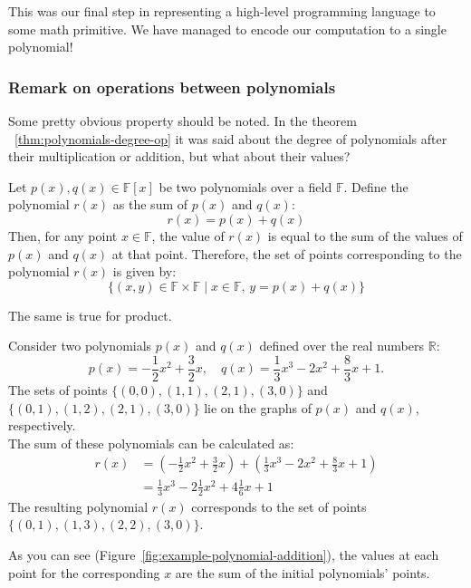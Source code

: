 \documentclass[../lecture-notes.tex]{subfiles}
\begin{document}
This was our final step in representing a high-level programming language to some math primitive.
We have managed to encode our computation to a single polynomial!

\subsubsection*{Remark on operations between polynomials}

\begin{remark}
    Some pretty obvious property should be noted. In the theorem ~\ref{thm:polynomials-degree-op}
    it was said about the degree of polynomials after their multiplication or addition, but what
    about their values?

    Let $p(x), q(x) \in \mathbb{F}[x]$ be two polynomials over a field $\mathbb{F}$. Define the 
    polynomial $r(x)$ as the sum of $p(x)$ and $q(x)$:
    \begin{equation*}
        r(x) = p(x) + q(x)
    \end{equation*}
    Then, for any point $x \in \mathbb{F}$, the value of $r(x)$ is equal to the sum of the
    values of $p(x)$ and $q(x)$ at that point. Therefore, the set of points corresponding to the 
    polynomial $r(x)$ is given by:
    \begin{equation*}
        \{(x, y) \in \mathbb{F} \times \mathbb{F} \mid x \in \mathbb{F}, \, y = p(x) + q(x) \}
    \end{equation*}

    The same is true for product.
\end{remark}

\begin{example}
    Consider two polynomials $p(x)$ and $q(x)$ defined over the real numbers $\mathbb{R}$:
    \begin{equation*}
        p(x) = -\frac{1}{2}x^2 + \frac{3}{2}x, \quad
        q(x) = \frac{1}{3}x^3 - 2x^2 + \frac{8}{3}x + 1.
    \end{equation*}
    The sets of points $\{(0, 0), (1, 1), (2, 1), (3, 0)\}$ and $\{(0, 1), (1, 2), (2, 1), (3, 0)\}$
    lie on the graphs of $p(x)$ and $q(x)$, respectively.\\
    
    The sum of these polynomials can be calculated as:
    \begin{align*}
        r(x) &= (-\frac{1}{2}x^2 + \frac{3}{2}x) + (\frac{1}{3}x^3 - 2x^2 + \frac{8}{3}x + 1) \\
             &= \frac{1}{3}x^3 - 2\frac{1}{2}x^2 + 4\frac{1}{6}x + 1
    \end{align*}
    The resulting polynomial $r(x)$ corresponds to the set of points $\{(0, 1), (1, 3), (2, 2), (3, 0)\}$.
    
    As you can see (Figure~\ref{fig:example-polynomial-addition}), the values at each point for the 
    corresponding $x$ are the sum of the initial polynomials' points.
\end{example}
\end{document}
